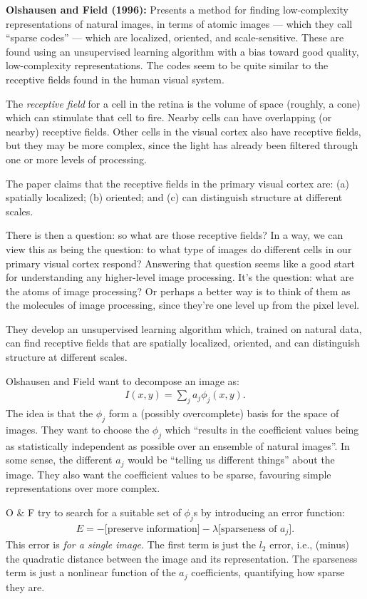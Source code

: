 \documentclass[12pt]{article}
\begin{document}
\textbf{Olshausen and Field (1996):} Presents a method for finding
low-complexity representations of natural images, in terms of atomic
images --- which they call ``sparse codes'' --- which are localized,
oriented, and scale-sensitive.  These are found using an unsupervised
learning algorithm with a bias toward good quality, low-complexity
representations.  The codes seem to be quite similar to the receptive
fields found in the human visual system.

The \emph{receptive field} for a cell in the retina is the volume of
space (roughly, a cone) which can stimulate that cell to fire.  Nearby
cells can have overlapping (or nearby) receptive fields.  Other cells
in the visual cortex also have receptive fields, but they may be more
complex, since the light has already been filtered through one or more
levels of processing.  

The paper claims that the receptive fields in the primary visual
cortex are: (a) spatially localized; (b) oriented; and (c) can
distinguish structure at different scales.

There is then a question: so what are those receptive fields?  In a
way, we can view this as being the question: to what type of images do
different cells in our primary visual cortex respond?  Answering that
question seems like a good start for understanding any higher-level
image processing.  It's the question: what are the atoms of image
processing?  Or perhaps a better way is to think of them as the
molecules of image processing, since they're one level up from the
pixel level.

They develop an unsupervised learning algorithm which, trained on
natural data, can find receptive fields that are spatially localized,
oriented, and can distinguish structure at different scales.

Olshausen and Field want to decompose an image as:
\begin{eqnarray}
  I(x,y) = \sum_j a_j \phi_j(x,y).
\end{eqnarray}
The idea is that the $\phi_j$ form a (possibly overcomplete) basis for
the space of images.  They want to choose the $\phi_j$ which ``results
in the coefficient values being as statistically independent as
possible over an ensemble of natural images''.  In some sense, the
different $a_j$ would be ``telling us different things'' about the
image.  They also want the coefficient values to be sparse, favouring
simple representations over more complex.

O \& F try to search for a suitable set of $\phi_j$s by introducing an
error function:
\begin{eqnarray}
  E = -\mbox{[preserve information]}-\lambda\mbox{[sparseness of } a_j {]}.
\end{eqnarray}
This error is \emph{for a single image}.  The first term is just the
$l_2$ error, i.e., (minus) the quadratic distance between the image
and its representation.  The sparseness term is just a nonlinear
function of the $a_j$ coefficients, quantifying how sparse they are.
\end{document}
